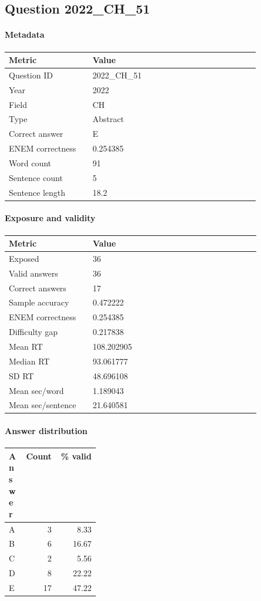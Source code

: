 \subsection*{Question 2022\_CH\_51}
\label{sec:q_2022_CH_51}
\paragraph{Metadata}
\begin{tabular}{p{0.30\linewidth}p{0.60\linewidth}}
\toprule
Metric & Value\\
\midrule
Question ID & 2022\_CH\_51\\
Year & 2022\\
Field & CH\\
Type & Abstract\\
Correct answer & E\\
ENEM correctness & 0.254385\\
Word count & 91\\
Sentence count & 5\\
Sentence length & 18.2\\
\bottomrule
\end{tabular}

\paragraph{Exposure and validity}
\begin{tabular}{p{0.30\linewidth}p{0.60\linewidth}}
\toprule
Metric & Value\\
\midrule
Exposed & 36\\
Valid answers & 36\\
Correct answers & 17\\
Sample accuracy & 0.472222\\
ENEM correctness & 0.254385\\
Difficulty gap & 0.217838\\
Mean RT & 108.202905\\
Median RT & 93.061777\\
SD RT & 48.696108\\
Mean sec/word & 1.189043\\
Mean sec/sentence & 21.640581\\
\bottomrule
\end{tabular}

\paragraph{Answer distribution}
\begin{tabular}{p{0.18\linewidth}rr}
\toprule
Answer & Count & \% valid\\
\midrule
A & 3 & 8.33\\
B & 6 & 16.67\\
C & 2 & 5.56\\
D & 8 & 22.22\\
E & 17 & 47.22\\
\bottomrule
\end{tabular}

